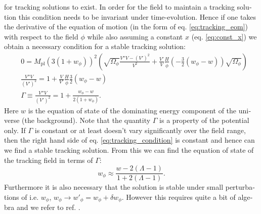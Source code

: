 \documentclass[master,       %
               twoside,        %
               BCOR10mm,       %
               english,ngerman, %
               ]{GAUBM}
\begin{document}
\begin{otherlanguage}{english}
for tracking solutions to exist.
In order for the field to maintain a tracking solution this condition needs to be invariant under time-evolution. Hence if one takes the derivative of the equation of motion (in the form of eq. \eqref{eq:tracking_eom}) with respect to the field $\phi$ while also assuming a constant $x$ (eq. \eqref{eq:const_x}) we obtain a necessary condition for a stable tracking solution:
\begin{align}
	&0 = M_\mathrm{pl}  (3(1 + w_\phi))^2 \left( \sqrt{\Omega_\phi} \frac{V'' V - (V')^2}{V^2} + \frac{V'}{V} \frac{H}{\dot{\phi}} \left( - \frac{3}{2} (w_\phi - w) \right) \sqrt{\Omega_\phi} \right) \nonumber \\
	&\frac{V'' V}{(V')^2} = 1 + \frac{V}{V'} \frac{H}{\dot{\phi}} \frac{3}{2} (w_\phi - w) \nonumber \\
	& \Gamma \equiv \frac{V'' V}{(V')^2} = 1 + \frac{w_\phi - w}{2(1 + w_\phi)}.
	\label{eq:tracking_condition}
\end{align}
Here $w$ is the equation of state of the dominating energy component of the universe (the background).
Note that the quantity $\Gamma$ is a property of the potential only.
If $\Gamma$ is constant or at least doesn't vary significantly over the field range, then the right hand side of eq. \eqref{eq:tracking_condition}  is constant and hence can we find a stable tracking solution.
From this we can find the equation of state of the tracking field in terms of $\Gamma$:
\begin{equation}
	\label{eq:tracking_equation_of_state}
	w_\phi \approx \frac{w - 2(\Lambda - 1)}{1 + 2(\Lambda - 1)}.
\end{equation}
Furthermore it is also necessary that the solution is stable under small perturbations of i.e. $w_\phi$, $w_\phi \to w'_\phi = w_\phi + \delta w_\phi$. However this requires quite a bit of algebra and we refer to ref. \cite{tracking_solutions_Steinhardt:1999nw}.


\end{otherlanguage}
\end{document}

